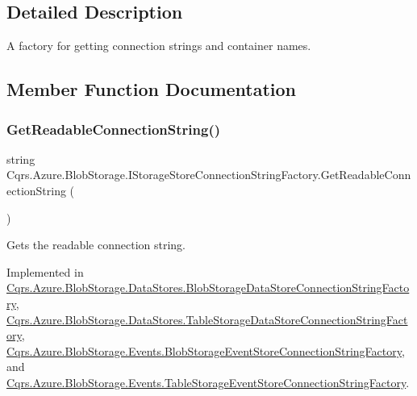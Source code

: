 \subsection{Detailed Description}
A factory for getting connection strings and container names. 



\subsection{Member Function Documentation}
\mbox{\label{interfaceCqrs_1_1Azure_1_1BlobStorage_1_1IStorageStoreConnectionStringFactory_a0ed836289e048767f753630bbcc98d5d_a0ed836289e048767f753630bbcc98d5d}} 
\subsubsection{\texorpdfstring{Get\+Readable\+Connection\+String()}{GetReadableConnectionString()}}
{\footnotesize\ttfamily string Cqrs.\+Azure.\+Blob\+Storage.\+I\+Storage\+Store\+Connection\+String\+Factory.\+Get\+Readable\+Connection\+String (\begin{DoxyParamCaption}{ }\end{DoxyParamCaption})}



Gets the readable connection string. 



Implemented in \hyperlink{classCqrs_1_1Azure_1_1BlobStorage_1_1DataStores_1_1BlobStorageDataStoreConnectionStringFactory_a1b5b69109d07e5612df981012d812e78_a1b5b69109d07e5612df981012d812e78}{Cqrs.\+Azure.\+Blob\+Storage.\+Data\+Stores.\+Blob\+Storage\+Data\+Store\+Connection\+String\+Factory}, \hyperlink{classCqrs_1_1Azure_1_1BlobStorage_1_1DataStores_1_1TableStorageDataStoreConnectionStringFactory_a0bdcd6f6d273a225c3ebcd6aa9386b95_a0bdcd6f6d273a225c3ebcd6aa9386b95}{Cqrs.\+Azure.\+Blob\+Storage.\+Data\+Stores.\+Table\+Storage\+Data\+Store\+Connection\+String\+Factory}, \hyperlink{classCqrs_1_1Azure_1_1BlobStorage_1_1Events_1_1BlobStorageEventStoreConnectionStringFactory_aa47606e4cd5a71437bed71e07fda53ed_aa47606e4cd5a71437bed71e07fda53ed}{Cqrs.\+Azure.\+Blob\+Storage.\+Events.\+Blob\+Storage\+Event\+Store\+Connection\+String\+Factory}, and \hyperlink{classCqrs_1_1Azure_1_1BlobStorage_1_1Events_1_1TableStorageEventStoreConnectionStringFactory_a047e58aa30e97231dc913df350bc2446_a047e58aa30e97231dc913df350bc2446}{Cqrs.\+Azure.\+Blob\+Storage.\+Events.\+Table\+Storage\+Event\+Store\+Connection\+String\+Factory}.

